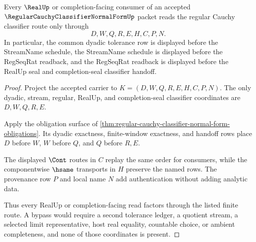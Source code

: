 \begin{theorem}
\label{thm:regular-cauchy-classifier-normal-form-real-handoff}
Every $\RealUp$ or completion-facing consumer of an accepted $\RegularCauchyClassifierNormalFormUp$ packet reads the regular Cauchy classifier route only through
$$
D,W,Q,R,E,H,C,P,N.
$$
In particular, the common dyadic tolerance row is displayed before the StreamName schedule, the StreamName schedule is displayed before the RegSeqRat readback, and the RegSeqRat readback is displayed before the RealUp seal and completion-seal classifier handoff.
\end{theorem}
\begin{proof}
Project the accepted carrier to $K=(D,W,Q,R,E,H,C,P,N)$. The only dyadic, stream, regular, RealUp, and completion-seal classifier coordinates are $D,W,Q,R,E$.

Apply the obligation surface of \autoref{thm:regular-cauchy-classifier-normal-form-obligations}. Its dyadic exactness, finite-window exactness, and handoff rows place $D$ before $W$, $W$ before $Q$, and $Q$ before $R,E$.

The displayed $\Cont$ routes in $C$ replay the same order for consumers, while the componentwise $\hsame$ transports in $H$ preserve the named rows. The provenance row $P$ and local name $N$ add authentication without adding analytic data.

Thus every RealUp or completion-facing read factors through the listed finite route. A bypass would require a second tolerance ledger, a quotient stream, a selected limit representative, host real equality, countable choice, or ambient completeness, and none of those coordinates is present.
\end{proof}




